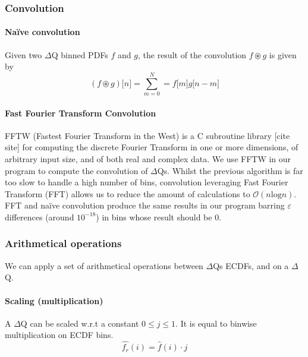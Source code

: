         \subsubsection{Convolution}
        
        \paragraph{Naïve convolution}
        Given two $\Delta$Q binned PDFs $f$ and $g$, the result of the convolution $f \circledast g$ is given by 
        \begin{equation}
            (f \circledast g)\lbrack n \rbrack = \sum_{m = 0}^{N} = f\lbrack m \rbrack g \lbrack n - m \rbrack  
            \label{eq:discconv}
        \end{equation}
            

    \paragraph{Fast Fourier Transform Convolution}
        FFTW (Fastest Fourier Transform in the West) is a C subroutine library [cite site] for computing the discrete Fourier Transform in one or more dimensions, of arbitrary input size, and of both real and complex data. We use FFTW in our program to compute the convolution of $\Delta$Qs.
    Whilst the previous algorithm is far too slow to handle a high number of bins, convolution leveraging Fast Fourier Transform (FFT) allows us to reduce the amount of calculations to $\mathcal{O}(n \text{log} n)$. \\
    FFT and naïve convolution produce the same results in our program barring $\varepsilon$ differences (around $10^{-18}$) in bins whose result should be 0.

    \subsubsection{Arithmetical operations}
        We can apply a set of arithmetical operations between $\Delta$Qs ECDFs, and on a $\Delta$Q.
    \paragraph{Scaling (multiplication)} A $\Delta$Q can be scaled w.r.t a constant $0 \le j \le 1$. It is equal to binwise multiplication on ECDF bins.
    \begin{equation}
        \hat{f_r}(i) = \hat{f}(i) \cdot j
        \label{eq:mul_ecdf}
    \end{equation}

